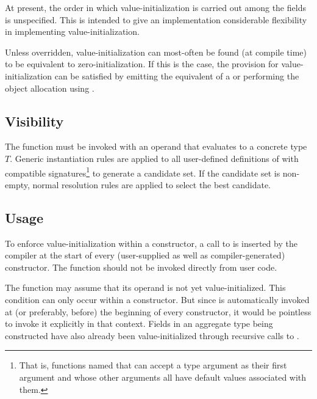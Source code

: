 \begin{note}
At present, the order in which value-initialization is carried out among the
fields is unspecified.  This is intended to give an implementation considerable
flexibility in implementing value-initialization.

Unless overridden, value-initialization can most-often be found (at compile
time) to be equivalent to zero-initialization.  If this is the case, the
provision for value-initialization can be satisfied by emitting the equivalent
of a  or performing the object allocation using .
\end{note}

\subsection{Visibility}

The  function must be invoked with an operand that evaluates
to a concrete type $T$.  Generic instantiation rules are applied to all
user-defined definitions of  with compatible
signatures\footnote{That is, functions named  that can accept a type
  argument as their first argument and whose other arguments all have default
  values associated with them.} to generate a candidate set.  If the candidate
set is non-empty, normal resolution rules are applied to select the best
candidate.

\subsection{Usage}

To enforce value-initialization within a constructor, a call to  is
inserted by the compiler at the start of every (user-supplied as well as
compiler-generated) constructor.  The  function should not be
invoked directly from user code.

\begin{rationale}

The  function may assume that its operand is not yet
value-initialized.  This condition can only occur within a constructor.  But since
 is automatically invoked at (or preferably, before) the
beginning of every constructor, it would be pointless to invoke it explicitly in
that context. Fields in an aggregate type being constructed have also already been
value-initialized through recursive calls to .

\end{rationale}

